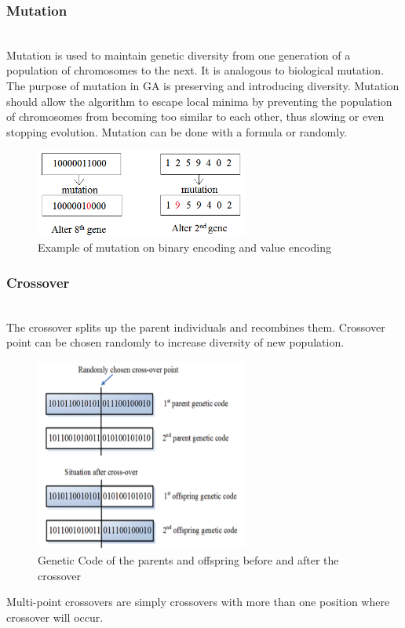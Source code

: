 \documentclass[conference]{IEEEtran}
\begin{document}
\subsubsection{Mutation}
~\\
\indent
Mutation is used to maintain genetic diversity from one generation of a population of
chromosomes to the next. It is analogous to biological mutation. \\
\indent
The purpose of mutation in GA is preserving and introducing diversity. Mutation should
allow the algorithm to escape local minima by preventing the population of chromosomes
from becoming too similar to each other, thus slowing or even stopping evolution. Mutation can be done with a formula or randomly.
\begin{figure}[H]
    \centering
    \includegraphics[width=7cm]{mutation}
    \caption{Example of mutation on binary encoding and value encoding}
    \label{fig:fig3}
\end{figure}
\subsubsection{Crossover}
~\\
\indent
The crossover splits up the parent individuals and recombines them. Crossover point can be chosen randomly to increase diversity of new population.
\begin{figure}[H]
    \centering
    \includegraphics[width=7cm]{crossover}
    \caption{Genetic Code of the parents and offspring before and after the crossover~\cite{4}}
    \label{fig:fig4}
\end{figure}
\indent
Multi-point crossovers are simply crossovers with
more than one position where crossover will occur.
\end{document}
